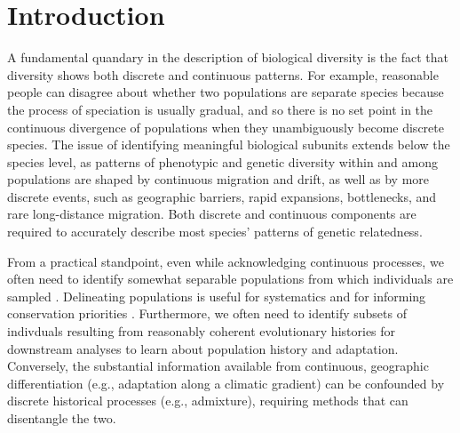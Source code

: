 \documentclass[10pt,letterpaper]{article}
\newif\ifsubmissionversion
\begin{document}

\ifsubmissionversion
\linenumbers
\fi

\newpage
\section*{Introduction}
A fundamental quandary in the description of biological diversity is
the fact that diversity shows both discrete and continuous patterns. 
For example, reasonable people can disagree about whether two 
populations are separate species because the 
process of speciation is usually gradual, and so there is no set point
in the continuous divergence of populations when they unambiguously become discrete species.
The issue of identifying meaningful biological subunits 
extends below the species level, as patterns of phenotypic
and genetic diversity within and among populations are shaped
by continuous migration and drift, as well as by more discrete events, 
such as geographic barriers, rapid expansions, bottlenecks, and rare
long-distance migration. 
Both discrete and continuous components
are required to accurately describe most species' patterns of genetic relatedness.

From a practical standpoint, even while acknowledging continuous
processes, we often need to identify somewhat separable populations 
from which individuals are sampled \cite{wright1949genetical}.
Delineating populations is useful for systematics and for
informing conservation priorities \cite{Moritz1994,Waples_1998,Moritz_etal_2002}.
Furthermore, we often need to identify subsets of indivduals resulting from reasonably coherent
evolutionary histories for downstream analyses to learn about population history and adaptation.
Conversely,
the substantial information available from continuous, geographic differentiation
(e.g., adaptation along a climatic gradient)
can be confounded by discrete historical processes (e.g., admixture),
requiring methods that can disentangle the two.
\end{document}
